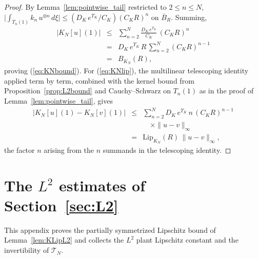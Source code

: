 \documentclass[10pt,a4paper]{amsart}
\newcommand{\Tcal}{\mathcal{T}}
\newcommand{\Ltwo}{L^2}
\newcommand{\LipKn}{\mathrm{Lip}_{K_N}}
\begin{document}
\begin{proof}
By Lemma~\ref{lem:pointwise_tail} restricted to $2 \le n \le N$, $\bigl|\int_{T_n(1)} k_n\,u^{\otimes n}\,d\xi\bigr| \le (D_K\,e^{\Upsilon_K}/C_K)(C_K R)^n$ on $\overline B_R$. Summing,
\begin{eqnarray}
|K_N[u](1)| &\le & \sum_{n=2}^N \frac{D_K\,e^{\Upsilon_K}}{C_K}\,(C_K R)^n \nonumber\\
&=& D_K\,e^{\Upsilon_K}\,R\,\sum_{n=2}^N (C_K R)^{n-1} \nonumber \\
&=& B_{K_N}(R),
\label{eq:KNbound_proof}
\end{eqnarray}
proving (\ref{eq:KNbound}). For (\ref{eq:KNlip}), the multilinear telescoping identity applied term by term, combined with the kernel bound from Proposition~\ref{prop:L2bound} and Cauchy--Schwarz on $T_n(1)$ as in the proof of Lemma~\ref{lem:pointwise_tail}, gives
\begin{eqnarray}
|K_N[u](1) - K_N[v](1)| &\le & \sum_{n=2}^N D_K\,e^{\Upsilon_K}\,n\,(C_K R)^{n-1} \nonumber \\
&& \quad \times \|u - v\|_\infty \nonumber\\
&=& \LipKn(R)\,\|u - v\|_\infty,
\label{eq:KNlip_proof}
\end{eqnarray}
the factor $n$ arising from the $n$ summands in the telescoping identity.
\end{proof}

\section{The $\Ltwo$ estimates of Section~\ref{sec:L2}}\label{app:L2}

This appendix proves the partially symmetrized Lipschitz bound of Lemma~\ref{lem:KLipL2} and collects the $\Ltwo$ plant Lipschitz constant and the invertibility of $\Tcal_N$.
\end{document}
